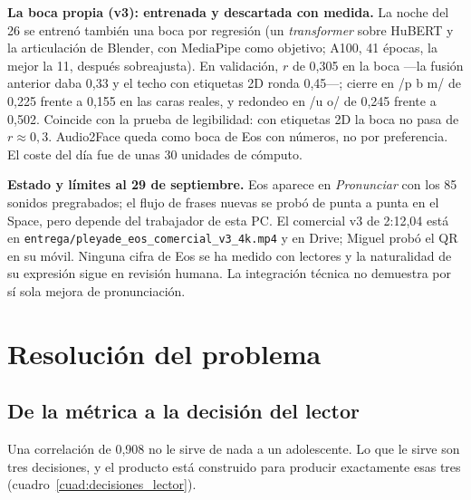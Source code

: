 \documentclass[11pt,a4paper]{article}
\newcommand{\cod}[1]{\texttt{\small #1}}
\begin{document}
\textbf{La boca propia (v3): entrenada y descartada con medida.} La noche del 26 se entrenó
también una boca por regresión (un \emph{transformer} sobre HuBERT y la articulación de
Blender, con MediaPipe como objetivo; A100, 41 épocas, la mejor la 11, después sobreajusta). En
validación, $r$ de 0,305 en la boca ---la fusión anterior daba 0,33 y el techo con etiquetas 2D
ronda 0,45---; cierre en /p b m/ de 0,225 frente a 0,155 en las caras reales, y redondeo en
/u o/ de 0,245 frente a 0,502. Coincide con la prueba de legibilidad: con etiquetas 2D la boca
no pasa de $r \approx 0{,}3$. Audio2Face queda como boca de Eos con números, no por preferencia.
El coste del día fue de unas 30 unidades de cómputo.

\textbf{Estado y límites al 29 de septiembre.} Eos aparece en \emph{Pronunciar} con
los 85 sonidos pregrabados; el flujo de frases nuevas se probó de punta a punta
en el Space, pero depende del trabajador de esta PC. El comercial v3 de 2:12,04
está en \cod{entrega/pleyade\_eos\_comercial\_v3\_4k.mp4} y en Drive; Miguel
probó el QR en su móvil. Ninguna cifra de Eos se ha medido con lectores y la
naturalidad de su expresión sigue en revisión humana. La integración técnica
no demuestra por sí sola mejora de pronunciación.

\section{Resolución del problema}
\label{sec:resolucion}

\subsection{De la métrica a la decisión del lector}

Una correlación de 0,908 no le sirve de nada a un adolescente. Lo que le sirve son tres
decisiones, y el producto está construido para producir exactamente esas tres
(cuadro~\ref{cuad:decisiones_lector}).
\end{document}
